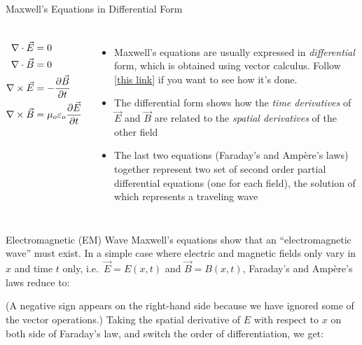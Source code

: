 \documentclass[12pt,aspectratio=169]{beamer}
\begin{document}
\begin{frame}{Maxwell's Equations in Differential Form}
  \begin{columns}
    \large
    \begin{align*}
      \nabla\cdot\vec E &= 0\\
      \nabla\cdot\vec B &= 0\\
      \nabla\times\vec E &=-\diffp{\vec B}t \\
      \nabla\times\vec B &=\mu_o\varepsilon_o\diffp{\vec E}t
    \end{align*}

    \begin{itemize}
    \item Maxwell's equations are usually expressed in \emph{differential} form,
      which is obtained using vector calculus. Follow
      [\underline{\href{https://www.wikihow.com/Convert-Maxwell\%27s-Equations-into-Differential-Form}{this link}}] if you want to see how it's done.
    \item The differential form shows how the \emph{time derivatives} of
      $\vec E$ and $\vec B$ are related to the \emph{spatial derivatives}
      of the other field
    \item The last two equations (Faraday's and Amp\`{e}re's laws) together
      represent two set of second order partial differential equations (one for
      each field), the solution of which represents a traveling wave
    \end{itemize}
  \end{columns}
\end{frame}



\begin{frame}{Electromagnetic (EM) Wave}
  Maxwell's equations show that an ``electromagnetic wave'' must exist. In a
  simple case where electric and magnetic fields only vary in $x$ and time $t$
  only, i.e.\ $\vec E=E(x,t)$ and $\vec B=B(x,t)$, Faraday's and Amp\`{e}re's
  laws reduce to:


  (A negative sign appears on the right-hand side because we have ignored some
  of the vector operations.) Taking the spatial derivative of $E$ with respect
  to $x$ on both side of Faraday's law, and switch the order of
  differentiation, we get:

\end{frame}
\end{document}
